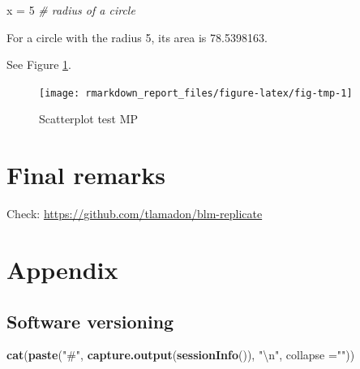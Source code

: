 \documentclass[
  12pt,
]{article}
\newenvironment{Shaded}{\begin{snugshade}}{\end{snugshade}}
\newcommand{\CharTok}[1]{\textcolor[rgb]{0.31,0.60,0.02}{#1}}
\newcommand{\CommentTok}[1]{\textcolor[rgb]{0.56,0.35,0.01}{\textit{#1}}}
\newcommand{\DataTypeTok}[1]{\textcolor[rgb]{0.13,0.29,0.53}{#1}}
\newcommand{\DecValTok}[1]{\textcolor[rgb]{0.00,0.00,0.81}{#1}}
\newcommand{\KeywordTok}[1]{\textcolor[rgb]{0.13,0.29,0.53}{\textbf{#1}}}
\newcommand{\NormalTok}[1]{#1}
\newcommand{\StringTok}[1]{\textcolor[rgb]{0.31,0.60,0.02}{#1}}
\begin{document}
\begin{Shaded}
\begin{Highlighting}[]
\NormalTok{x =}\StringTok{ }\DecValTok{5}  \CommentTok{# radius of a circle}
\end{Highlighting}
\end{Shaded}

For a circle with the radius 5,
its area is 78.5398163.

See Figure \ref{fig:fig-tmp}.

\begin{figure}[ht]

{\centering \texttt{[image: rmarkdown\_report\_files/figure-latex/fig-tmp-1]} 

}

\caption{Scatterplot test MP}\label{fig:fig-tmp}
\end{figure}

\hypertarget{final-remarks}{%
\section{Final remarks}\label{final-remarks}}

Check: \url{https://github.com/tlamadon/blm-replicate}

\newpage

\hypertarget{appendix}{%
\section{Appendix}\label{appendix}}

\hypertarget{software-versioning}{%
\subsection{Software versioning}\label{software-versioning}}

\begin{Shaded}
\begin{Highlighting}[]
\KeywordTok{cat}\NormalTok{(}\KeywordTok{paste}\NormalTok{(}\StringTok{"#"}\NormalTok{, }\KeywordTok{capture.output}\NormalTok{(}\KeywordTok{sessionInfo}\NormalTok{()), }\StringTok{"}\CharTok{\textbackslash{}n}\StringTok{"}\NormalTok{, }\DataTypeTok{collapse =}\StringTok{""}\NormalTok{)) }
\end{Highlighting}
\end{Shaded}
\end{document}
